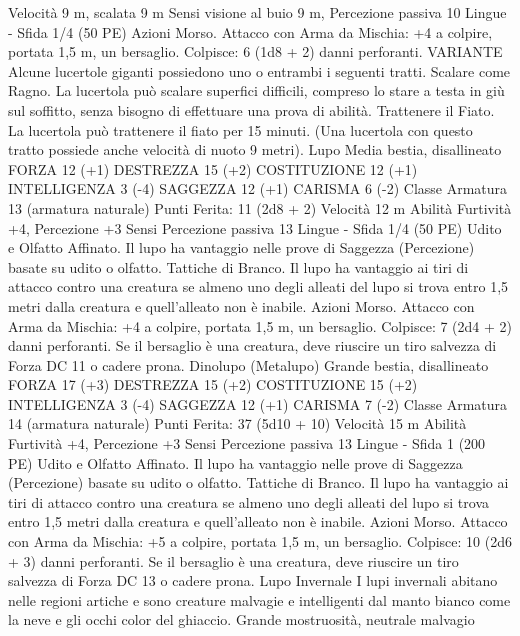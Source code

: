 \begin{multicols}{2}
Velocità 9 m, scalata 9 m
Sensi visione al buio 9 m, Percezione passiva 10
Lingue -
Sfida 1/4 (50 PE)
Azioni
Morso. Attacco con Arma da Mischia: +4 a colpire, portata 1,5
m, un bersaglio.
Colpisce: 6 (1d8 + 2) danni perforanti.
VARIANTE
Alcune lucertole giganti possiedono uno o entrambi i seguenti
tratti.
Scalare come Ragno. La lucertola può scalare superfici difficili,
compreso lo stare a testa in giù sul soffitto, senza bisogno di
effettuare una prova di abilità.
Trattenere il Fiato. La lucertola può trattenere il fiato per 15
minuti. (Una lucertola con questo tratto possiede anche velocità
di nuoto 9 metri).
Lupo
Media bestia, disallineato
FORZA 12 (+1)
DESTREZZA 15 (+2)
COSTITUZIONE 12 (+1)
INTELLIGENZA 3 (-4)
SAGGEZZA 12 (+1)
CARISMA 6 (-2)
Classe Armatura 13 (armatura naturale)
\hspace*{0pt}\hfill{Punti Ferita}: 11 (2d8 + 2)
Velocità 12 m
Abilità Furtività +4, Percezione +3
Sensi Percezione passiva 13
Lingue -
Sfida 1/4 (50 PE)
Udito e Olfatto Affinato. Il lupo ha vantaggio nelle prove di
Saggezza (Percezione) basate su udito o olfatto.
Tattiche di Branco. Il lupo ha vantaggio ai tiri di attacco contro
una creatura se almeno uno degli alleati del lupo si trova entro
1,5 metri dalla creatura e quell’alleato non è inabile.
Azioni
Morso. Attacco con Arma da Mischia: +4 a colpire, portata 1,5
m, un bersaglio.
Colpisce: 7 (2d4 + 2) danni perforanti. Se il bersaglio è una
creatura, deve riuscire un tiro salvezza di Forza DC 11 o cadere
prona.
Dinolupo (Metalupo)
Grande bestia, disallineato
FORZA 17 (+3)
DESTREZZA 15 (+2)
COSTITUZIONE 15 (+2)
INTELLIGENZA 3 (-4)
SAGGEZZA 12 (+1)
CARISMA 7 (-2)
Classe Armatura 14 (armatura naturale)
\hspace*{0pt}\hfill{Punti Ferita}: 37 (5d10 + 10)
Velocità 15 m
Abilità Furtività +4, Percezione +3
Sensi Percezione passiva 13
Lingue -
Sfida 1 (200 PE)
Udito e Olfatto Affinato. Il lupo ha vantaggio nelle prove di
Saggezza (Percezione) basate su udito o olfatto.
Tattiche di Branco. Il lupo ha vantaggio ai tiri di attacco contro
una creatura se almeno uno degli alleati del lupo si trova entro
1,5 metri dalla creatura e quell’alleato non è inabile.
Azioni
Morso. Attacco con Arma da Mischia: +5 a colpire, portata 1,5
m, un bersaglio.
Colpisce: 10 (2d6 + 3) danni perforanti. Se il bersaglio è una
creatura, deve riuscire un tiro salvezza di Forza DC 13 o cadere
prona.
Lupo Invernale
I lupi invernali abitano nelle regioni artiche e sono
creature malvagie e intelligenti dal manto bianco come
la neve e gli occhi color del ghiaccio.
Grande mostruosità, neutrale malvagio

\end{multicols}
